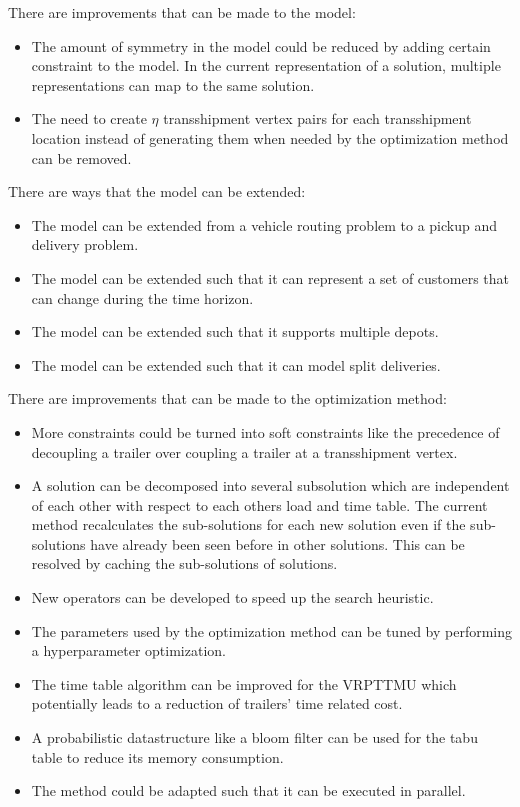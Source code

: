 There are improvements that can be made to the model:
\begin{itemize}
\item The amount of symmetry in the model could be reduced by adding certain constraint to the model.
In the current representation of a solution, multiple representations can map to the same solution.
\item The need to create $\eta$ transshipment vertex pairs for each transshipment location instead of generating them when needed by the optimization method can be removed.
\end{itemize}

There are ways that the model can be extended:
\begin{itemize}
  \item The model can be extended from a vehicle routing problem to a pickup and delivery problem.
  \item The model can be extended such that it can represent a set of customers that can change during the time horizon.
  \item The model can be extended such that it supports multiple depots.
  \item The model can be extended such that it can model split deliveries.
\end{itemize}

There are improvements that can be made to the optimization method:
\begin{itemize}
\item More constraints could be turned into soft constraints like the precedence of decoupling a trailer over coupling a trailer at a transshipment vertex.
\item A solution can be decomposed into several subsolution which are independent of each other with respect to each others load and time table.
The current method recalculates the sub-solutions for each new solution even if the sub-solutions have already been seen before in other solutions.
This can be resolved by caching the sub-solutions of solutions.
\item New operators can be developed to speed up the search heuristic.
\item The parameters used by the optimization method can be tuned by performing a  hyperparameter optimization.
\item The time table algorithm can be improved for the VRPTTMU which potentially leads to a reduction of trailers' time related cost.
\item A probabilistic datastructure like a bloom filter can be used for the tabu table to reduce its memory consumption.
\item The method could be adapted such that it can be executed in parallel.
\end{itemize}

